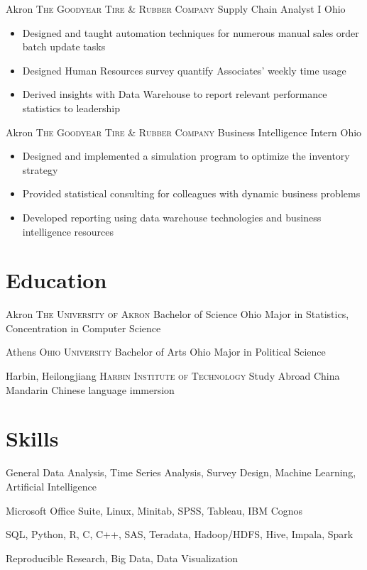 \documentclass[letterpaper,12pt,color,final]{moderncv}
\begin{document}
{Akron}
{\textsc{The Goodyear Tire \& Rubber Company}}
{Supply Chain Analyst I}
{Ohio}
{\begin{itemize}
  \item Designed and taught automation techniques for numerous manual sales order batch update tasks
  \item Designed Human Resources survey quantify Associates' weekly time usage
  \item Derived insights with Data Warehouse to report relevant performance statistics to leadership
 \end{itemize}}

{Akron}
{\textsc{The Goodyear Tire \& Rubber Company}}
{Business Intelligence Intern}
{Ohio}
{\begin{itemize}
  \item Designed and implemented a simulation program to optimize the inventory strategy
  \item Provided statistical consulting for colleagues with dynamic business problems
  \item Developed reporting using data warehouse technologies and business intelligence resources
 \end{itemize}}

\section{Education}

{Akron}
{\textsc{The University of Akron}}
{Bachelor of Science}
{Ohio}
{Major in Statistics, Concentration in Computer Science}

{Athens}
{\textsc{Ohio University}}
{Bachelor of Arts}
{Ohio}
{Major in Political Science}

{Harbin, Heilongjiang}
{\textsc{Harbin Institute of Technology}}
{Study Abroad}
{China}
{Mandarin Chinese language immersion}

\section{Skills}

{\newline{}
 General Data Analysis, Time Series Analysis, Survey Design, Machine Learning, Artificial Intelligence}

{\newline{}
 Microsoft Office Suite, Linux, Minitab, SPSS, Tableau, IBM Cognos}

{\newline{}
 SQL, Python, R, C, C++, SAS, Teradata, Hadoop/HDFS, Hive, Impala, Spark}

{\newline{}
 Reproducible Research, Big Data, Data Visualization}
\end{document}
